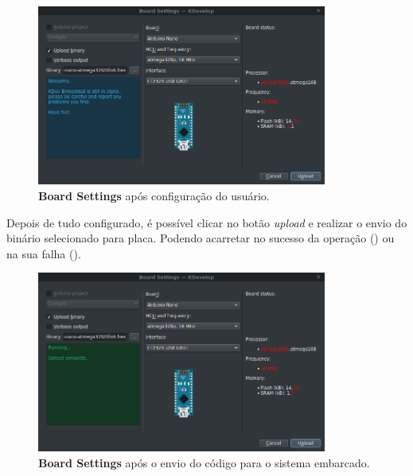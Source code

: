 \begin{figure}[!htb]
  \centering
  \includegraphics[width=0.85\textwidth]{figuras/boardsettingsSerial.png}
  \caption[Board Settings após configuração para envio]{\textbf{Board Settings} após configuração do usuário.}
  \label{fig:boardsettingsserial}
\end{figure}

Depois de tudo configurado, é possível clicar no botão \textit{upload} e realizar o envio do binário selecionado para placa. Podendo acarretar no sucesso da operação () ou na sua falha ().

\begin{figure}[!htb]
  \centering
  \includegraphics[width=0.85\textwidth]{figuras/boardsettingsdone.png}
  \caption[Board Settings com sucesso no envio]{\textbf{Board Settings} após o envio do código para o sistema embarcado.}
  \label{fig:boardsettingsdone}
\end{figure}

